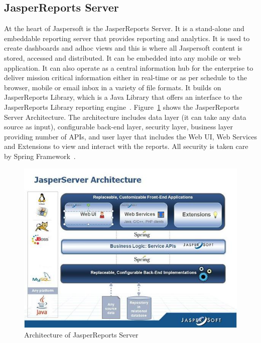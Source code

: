 \subsection{JasperReports Server}
At the heart of Jaspersoft is the JasperReports Server. It is a stand-alone and
embeddable reporting server that provides reporting and analytics. It is used to
create dashboards and adhoc views and this is where all Jaspersoft content is
stored, accessed and distributed. It can be embedded into any mobile or web
application. It can also operate as a central information hub for the enterprise
to deliver mission critical information either in real-time or as per schedule
to the browser, mobile or email inbox in a variety of file formats. It builds on
JasperReports Library, which is a Java Library that offers an interface to the
JasperReports Library reporting
engine~\cite{hid-sp18-516-www-jasperreports-server}.
Figure~\ref{fig:jasperreports-server} shows the JasperReports Server
Architecture. The architecture includes data layer (it can take any data source
as input), configurable back-end layer, security layer, business layer providing
number of APIs, and user layer that includes the Web UI, Web Services and
Extensions to view and interact with the reports. All security is taken care by
Spring Framework~\cite{hid-sp18-516-www-jasperreports-server-architecture}. 

\begin{figure}[!ht]
	\centering\includegraphics[width=\columnwidth]{../images/jasperreports-server.jpg}
	\caption{Architecture of JasperReports Server~\cite{hid-sp18-516-www-jasperreports-server-architecture}}
 	\label{fig:jasperreports-server}
\end{figure}

